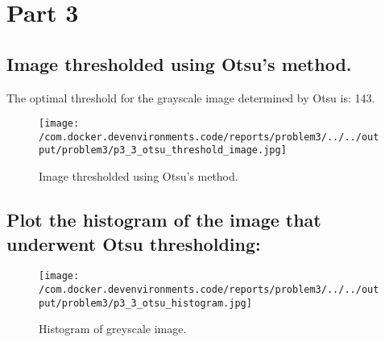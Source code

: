 \documentclass{article}%
\begin{document}
%
\section{Part 3}%
\label{sec:Part3}%
\subsection{Image thresholded using Otsu's method.}%
\label{subsec:ImagethresholdedusingOtsusmethod.}%
The optimal threshold for the grayscale image determined by Otsu is: 143.%


\begin{figure}[h!]%
\centering%
\texttt{[image: /com.docker.devenvironments.code/reports/problem3/../../output/problem3/p3\_3\_otsu\_threshold\_image.jpg]}%
\caption{Image thresholded using Otsu's method.}%
\end{figure}

%
\newpage%
\subsection{Plot the histogram of the image that underwent Otsu thresholding:}%
\label{subsec:PlotthehistogramoftheimagethatunderwentOtsuthresholding}%


\begin{figure}[h!]%
\centering%
\texttt{[image: /com.docker.devenvironments.code/reports/problem3/../../output/problem3/p3\_3\_otsu\_histogram.jpg]}%
\caption{Histogram of greyscale image.}%
\end{figure}

%
\end{document}
